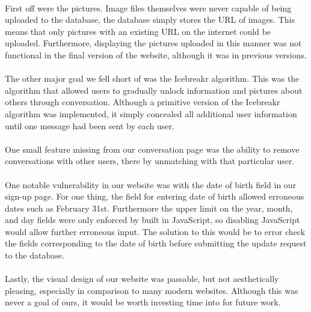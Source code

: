 \documentclass{article}
\begin{document}
    \paragraph{}First off were the pictures. Image files themselves were never capable of being uploaded to the database, the database simply stores the URL of images. This means that only pictures with an existing URL on the internet could be uploaded. Furthermore, displaying the pictures uploaded in this manner was not functional in the final version of the website, although it was in previous versions.
    \paragraph{}
    The other major goal we fell short of was the Icebreakr algorithm. This was the algorithm that allowed users to gradually unlock information and pictures about others through conversation. Although a primitive version of the Icebreakr algorithm was implemented, it simply concealed all additional user information until one message had been sent by each user.
    \paragraph{}
    One small feature missing from our conversation page was the ability to remove conversations with other users, there by unmatching with that particular user.
    \paragraph{}
    One notable vulnerability in our website was with the date of birth field in our sign-up page. For one thing, the field for entering date of birth allowed erroneous dates such as February 31st. Furthermore the upper limit on the year, month, and day fields were only enforced by built in JavaScript, so disabling JavaScript would allow further erroneous input. The solution to this would be to error check the fields corresponding to the date of birth before submitting the update request to the database.
    \paragraph{}
    Lastly, the visual design of our website was passable, but not aesthetically pleasing, especially in comparison to many modern websites. Although this was never a goal of ours, it would be worth investing time into for future work.
\end{document}
